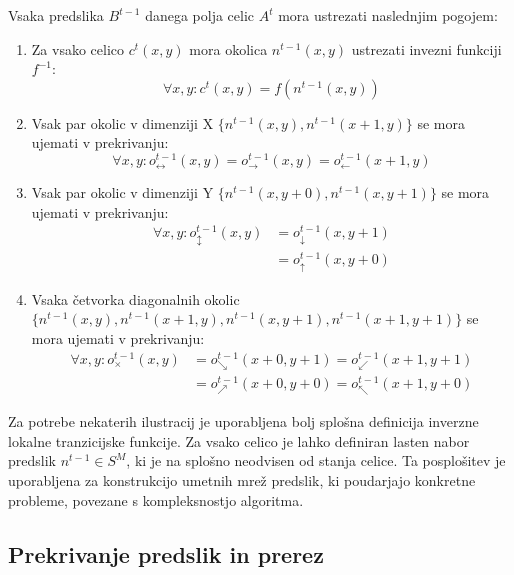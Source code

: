 \documentclass[12pt,a4paper,openany,twoside]{book}
\begin{document}
Vsaka predslika \(B^{t-1}\) danega polja celic \(A^t\) mora ustrezati naslednjim pogojem:
\begin{enumerate}
\item Za vsako celico \(c^{t}(x,y)\) mora okolica \(n^{t-1}(x,y)\) ustrezati invezni funkciji \(f^{-1}\):
\begin{equation}
\forall x,y : c^{t}(x,y) = f(n^{t-1}(x,y))
\end{equation}
\item Vsak par okolic v dimenziji X \(\{n^{t-1}(x,y), n^{t-1}(x+1,y)\}\) se mora ujemati v prekrivanju:
\begin{equation}
\forall x,y : o_{\leftrightarrow}^{t-1}(x,y) = o_{\rightarrow}^{t-1}(x,y) = o_{\leftarrow}^{t-1}(x+1,y)
\end{equation}
\item Vsak par okolic v dimenziji Y \(\{n^{t-1}(x,y+0), n^{t-1}(x,y+1)\}\) se mora ujemati v prekrivanju:
\begin{equation}
\begin{align}
\forall x,y : o_{\updownarrow}^{t-1}(x,y) &= o_{\downarrow}^{t-1}(x,y+1) \\
                                          &= o_{\uparrow}  ^{t-1}(x,y+0)
\end{align}
\end{equation}
\item Vsaka četvorka diagonalnih okolic \(\{n^{t-1}(x,y), n^{t-1}(x+1,y), n^{t-1}(x,y+1), n^{t-1}(x+1,y+1)\}\) se mora ujemati v prekrivanju:
\begin{equation}
\begin{align}
\forall x,y : o_{\times}^{t-1}(x,y) &= o_{\searrow}^{t-1}(x+0,y+1) = o_{\swarrow}^{t-1}(x+1,y+1) \\
                                    &= o_{\nearrow}^{t-1}(x+0,y+0) = o_{\nwarrow}^{t-1}(x+1,y+0)
\end{align}
\end{equation}
\end{enumerate}

Za potrebe nekaterih ilustracij je uporabljena bolj splošna definicija inverzne lokalne tranzicijske funkcije.
Za vsako celico je lahko definiran lasten nabor predslik \(n^{t-1} \in S^M\),
ki je na splošno neodvisen od stanja celice.
Ta posplošitev je uporabljena za konstrukcijo umetnih mrež predslik,
ki poudarjajo konkretne probleme, povezane s kompleksnostjo algoritma.

\subsection{Prekrivanje predslik in prerez}
\end{document}
